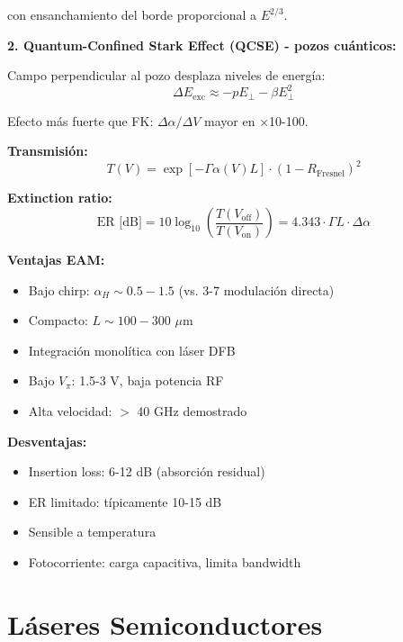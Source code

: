 \documentclass[11pt,a4paper]{article}
\begin{document}
con ensanchamiento del borde proporcional a $E^{2/3}$.

\textbf{2. Quantum-Confined Stark Effect (QCSE) - pozos cuánticos:}

Campo perpendicular al pozo desplaza niveles de energía:
\begin{equation}
    \Delta E_{\text{exc}} \approx -p E_{\perp} - \beta E_{\perp}^2
\end{equation}

Efecto más fuerte que FK: $\Delta\alpha/\Delta V$ mayor en ×10-100.

\textbf{Transmisión:}
\begin{equation}
    T(V) = \exp[-\Gamma\alpha(V)L] \cdot (1-R_{\text{Fresnel}})^2
\end{equation}

\textbf{Extinction ratio:}
\begin{equation}
    \text{ER [dB]} = 10\log_{10}\left(\frac{T(V_{\text{off}})}{T(V_{\text{on}})}\right) = 4.343 \cdot \Gamma L \cdot \Delta\alpha
\end{equation}

\begin{importante}
\textbf{Ventajas EAM:}
\begin{itemize}
    \item Bajo chirp: $\alpha_H \sim 0.5-1.5$ (vs. 3-7 modulación directa)
    \item Compacto: $L \sim 100-300$ $\mu$m
    \item Integración monolítica con láser DFB
    \item Bajo $V_\pi$: 1.5-3 V, baja potencia RF
    \item Alta velocidad: $>$ 40 GHz demostrado
\end{itemize}

\textbf{Desventajas:}
\begin{itemize}
    \item Insertion loss: 6-12 dB (absorción residual)
    \item ER limitado: típicamente 10-15 dB
    \item Sensible a temperatura
    \item Fotocorriente: carga capacitiva, limita bandwidth
\end{itemize}
\end{importante}

\section{Láseres Semiconductores}
\end{document}
